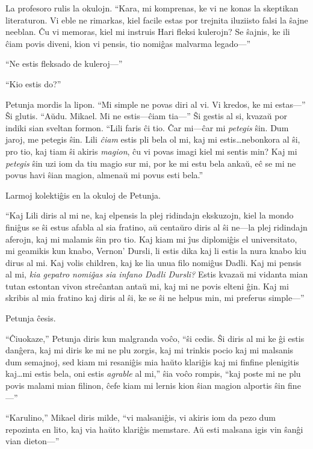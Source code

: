 La profesoro rulis la okulojn.
“Kara, mi komprenas, ke vi ne konas la skeptikan literaturon.
Vi eble ne rimarkas, kiel facile estas por trejnita iluziisto falsi la ŝajne neeblan.
Ĉu vi memoras, kiel mi instruis Hari fleksi kulerojn?
Se ŝajnis, ke ili ĉiam povis diveni, kion vi pensis, tio nomiĝas malvarma legado—”

“Ne estis fleksado de kuleroj—”

“Kio estis do?”

Petunja mordis la lipon.
“Mi simple ne povas diri al vi.
Vi kredos, ke mi estas—”
Ŝi glutis.
“Aŭdu.
Mikael.
Mi ne estis—ĉiam tia—”
Ŝi gestis al si, kvazaŭ por indiki sian sveltan formon.
“Lili faris ĉi tio.
Ĉar mi—ĉar mi \emph{petegis} ŝin.
Dum jaroj, me petegis ŝin.
Lili \emph{ĉiam} estis pli bela ol mi, kaj mi estis…nebonkora al ŝi, pro tio, kaj tiam ŝi akiris \emph{magion}, ĉu vi povas imagi kiel mi sentis min?
Kaj mi \emph{petegis} ŝin uzi iom da tiu magio sur mi, por ke mi estu bela ankaŭ, eĉ se mi ne povus havi ŝian magion, almenaŭ mi povus esti bela.”

Larmoj kolektiĝis en la okuloj de Petunja.

“Kaj Lili diris al mi ne, kaj elpensis la plej ridindajn ekskuzojn, kiel la mondo finiĝus se ŝi estus afabla al sia fratino, aŭ centaŭro diris al ŝi ne—la plej ridindajn aferojn, kaj mi malamis ŝin pro tio.
Kaj kiam mi ĵus diplomiĝis el universitato, mi geamikis kun knabo, Vernon' Dursli, li estis dika kaj li estis la nura knabo kiu dirus al mi.
Kaj volis children, kaj ke lia unua filo nomiĝus Dadli.
Kaj mi pensis al mi, \emph{kia gepatro nomiĝas sia infano Dadli Dursli?}
Estis kvazaŭ mi vidanta mian tutan estontan vivon streĉantan antaŭ mi, kaj mi ne povis elteni ĝin.
Kaj mi skribis al mia fratino kaj diris al ŝi, ke se ŝi ne helpus min, mi preferus simple—”

Petunja ĉesis.

“Ĉiuokaze,” Petunja diris kun malgranda voĉo, “ŝi cedis.
Ŝi diris al mi ke ĝi estis danĝera, kaj mi diris ke mi ne plu zorgis, kaj mi trinkis pocio kaj mi malsanis dum semajnoj, sed kiam mi resaniĝis mia haŭto klariĝis kaj mi finfine plenigitis kaj…mi estis bela, oni estis \emph{agrable} al mi,” ŝia voĉo rompis, “kaj poste mi ne plu povis malami mian filinon, ĉefe kiam mi lernis kion ŝian magion alportis ŝin fine—”

“Karulino,” Mikael diris milde, “vi malsaniĝis, vi akiris iom da pezo dum repozinta en lito, kaj via haŭto klariĝis memstare.
Aŭ esti malsana igis vin ŝanĝi vian dieton—”

